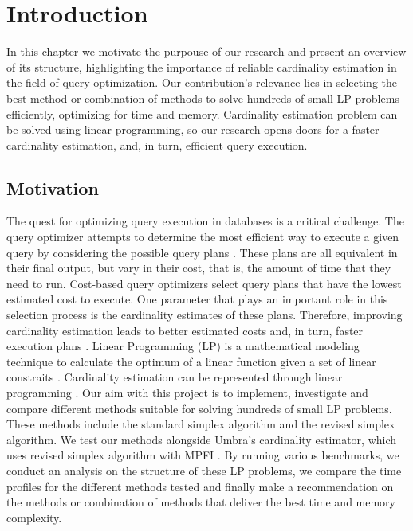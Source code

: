 

\chapter{Introduction}\label{chapter:introduction}
In this chapter we motivate the purpouse of our research and present an overview of its structure, highlighting the importance of  reliable cardinality estimation in the field of query optimization. Our contribution's relevance lies in selecting the best method or combination of methods to solve hundreds of small LP problems efficiently, optimizing for time and memory. Cardinality estimation problem can be solved using linear programming, so our research opens doors for a faster cardinality estimation, and, in turn, efficient query execution.

\section{Motivation}

The quest for optimizing query execution in databases is a critical
challenge. The query optimizer attempts 
to determine the most efficient way to execute a given query by considering the possible 
query plans \parencite{leis2018query}. 
These plans are all equivalent in their final output, but vary in their
cost, that is, the amount of time that they need to run.
Cost-based query optimizers select query plans that have the lowest estimated cost to
execute. One parameter that plays an important role in this selection process 
is the cardinality estimates 
of these plans. Therefore, improving cardinality estimation leads to better estimated costs 
and, in turn, faster execution plans \parencite{graefe1993volcano}.
Linear Programming (LP) is a mathematical modeling technique to calculate the optimum of a linear function
given a set of linear constraits \parencite{chvatal1983linear}.
Cardinality estimation can be represented through linear programming \parencite{atserias2013size}.
Our aim with this project is to implement, 
investigate and compare different methods suitable for solving hundreds of small LP 
problems. These methods include the standard simplex algorithm and the revised simplex algorithm.
 We test our methods alongside Umbra's cardinality estimator, which uses revised simplex algorithm
with MPFI \parencite{neumann2020umbra}. 
By running various benchmarks, we conduct an analysis on the structure of these LP problems,
we compare the time profiles for the different methods tested and finally 
make a recommendation on the methods or combination of methods that deliver the best time and memory 
complexity.


